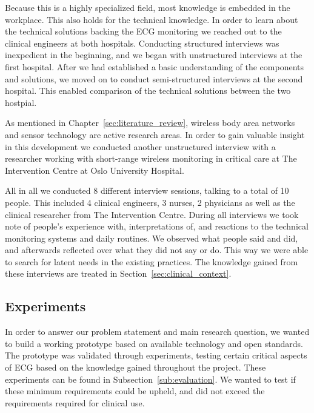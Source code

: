 Because this is a highly specialized field, most knowledge is embedded in the workplace. This also holds for the technical knowledge. In order to learn about the technical solutions backing the ECG monitoring we reached out to the clinical engineers at both hospitals. Conducting structured interviews was inexpedient in the beginning, and we began with unstructured interviews at the first hospital. After we had established a basic understanding of the components and solutions, we moved on to conduct semi-structured interviews at the second hospital. This enabled comparison of the technical solutions between the two hostpial.

As mentioned in Chapter~\ref{sec:literature_review}, wireless body area networks and sensor technology are active research areas. In order to gain valuable insight in this development we conducted another unstructured interview with a researcher working with short-range wireless monitoring in critical care at The Intervention Centre at Oslo University Hospital.

All in all we conducted 8 different interview sessions, talking to a total of 10 people. This included 4 clinical engineers, 3 nurses, 2 physicians as well as the clinical researcher from The Intervention Centre. During all interviews we took note of people's experience with, interpretations of, and reactions to the technical monitoring systems and daily routines. We observed what people said and did, and afterwards reflected over what they did not say or do. This way we were able to search for latent needs in the existing practices. The knowledge gained from these interviews are treated in  Section~\ref{sec:clinical_context}.


\subsection{Experiments} %
\label{sub:experiments}


In order to answer our problem statement and main research question, we wanted to build a working prototype based on available technology and open standards. The prototype was validated through experiments, testing certain critical aspects of ECG based on the knowledge gained throughout the project. These experiments can be found in Subsection~\ref{sub:evaluation}. We wanted to test if these minimum requirements could be upheld, and did not exceed the requirements required for clinical use.

